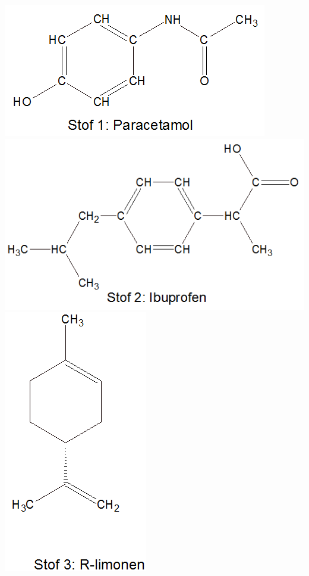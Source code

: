 \includegraphics[scale=0.5]{Billeder/paracetamol}
\includegraphics[scale=0.5]{Billeder/ibuprofen}
\includegraphics[scale=0.5]{Billeder/Rlimonen}
\vspace{0.8cm}
